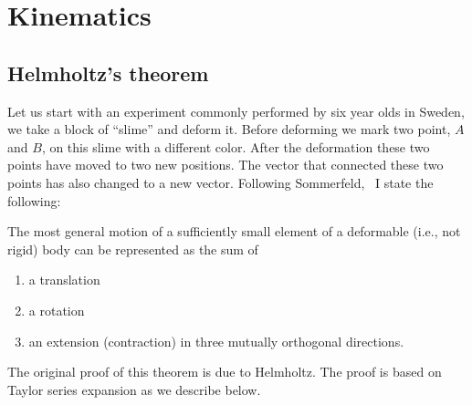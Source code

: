 %
%
%
\chapter{Kinematics} 
\label{ch:kinematics}
\section{Helmholtz's theorem}
\label{sec:helm}
Let us start with an experiment commonly performed by six year olds in
Sweden, we take a block of ``slime'' and deform it. Before deforming
we mark two point, $A$ and $B$,  on this slime with a different color. After the
deformation these two points have moved to two new positions. The
vector that connected these two points has also changed to a new
vector. Following Sommerfeld,~\cite{SomII06} I state the following: 
\marginnote{}
\begin{thm-non}
The most general motion of a sufficiently small element of a
deformable (i.e., not rigid) body can be represented as the sum of 
\begin{enumerate}
\item a translation
\item a rotation
\item an extension (contraction) in three mutually orthogonal
  directions. 
\end{enumerate}
\end{thm-non}
The original proof of this theorem is due to Helmholtz. 
The proof is based on Taylor series expansion as we describe below. 


